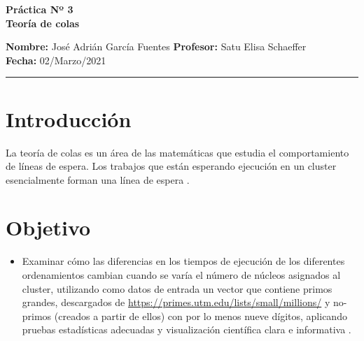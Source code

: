 \documentclass[a4paper]{article}
\begin{document}
\begin{center} %
\large \bf Práctica Nº 3   %
\\ %
Teoría de colas
\end{center} %
\textbf{Nombre:}   %
José Adrián García Fuentes
\hfill  %
\textbf{Profesor:}   %
Satu Elisa Schaeffer \hfill
\\
\textbf{Fecha:} 02/Marzo/2021        %
\\
\hrule    %
\medskip
 \section{Introducción}
\justify La teoría de colas es un área de las matemáticas que estudia el comportamiento de líneas de espera. Los trabajos que están esperando ejecución en un cluster esencialmente forman una línea de espera \cite{p3}.
\section{Objetivo}  %
\begin{itemize}   %
    \item Examinar cómo las diferencias en los tiempos de ejecución de los diferentes ordenamientos cambian cuando se varía el número de núcleos asignados al cluster, utilizando como datos de entrada un vector que contiene primos grandes, descargados de \url{https://primes.utm.edu/lists/small/millions/} y no-primos (creados a partir de ellos) con por lo menos nueve dígitos, aplicando pruebas estadísticas adecuadas y visualización científica clara e informativa \cite{p3}. 

\end{itemize}
\end{document}
